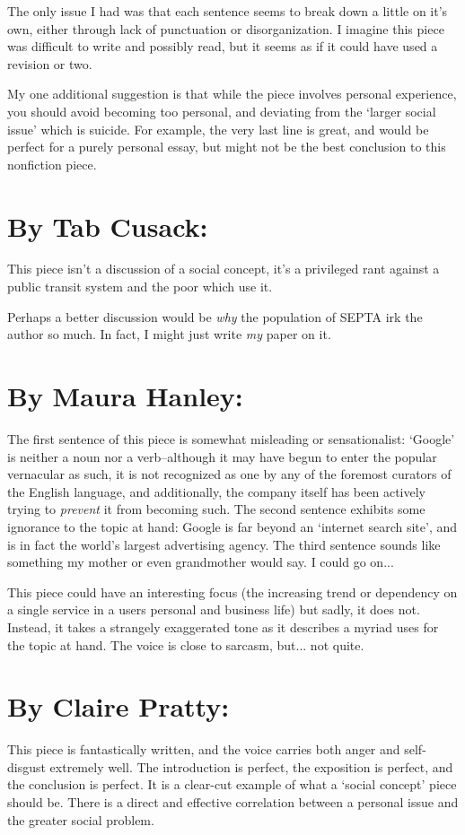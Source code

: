 \documentclass[letterpaper]{article}
\begin{document}
    The only issue I had was that each sentence seems to break down a little on it's own, either through lack of punctuation or disorganization. I imagine this piece was difficult to write and possibly read, but it seems as if it could have used a revision or two.

    My one additional suggestion is that while the piece involves personal experience, you should avoid becoming too personal, and deviating from the `larger social issue' which is suicide. For example, the very last line is great, and would be perfect for a purely personal essay, but might not be the best conclusion to this nonfiction piece.

    \section{By Tab Cusack:}
    This piece isn't a discussion of a social concept, it's a privileged rant against a public transit system and the poor which use it.

    Perhaps a better discussion would be \emph{why} the population of SEPTA irk the author so much. In fact, I might just write \emph{my} paper on it.
    \section{By Maura Hanley:}
    
    The first sentence of this piece is somewhat misleading or sensationalist: `Google' is neither a noun nor a verb--although it may have begun to enter the popular vernacular as such, it is not recognized as  one by any of the foremost curators of the English language, and additionally, the company itself has been actively trying to \emph{prevent} it from becoming such. The second sentence exhibits some ignorance to the topic at hand: Google is far beyond an `internet search site', and is in fact the world's largest advertising agency. The third sentence sounds like something my mother or even grandmother would say. I could go on...

    This piece could have an interesting focus (the increasing trend or dependency on a single service in a users personal and business life) but sadly, it does not. Instead, it takes a strangely exaggerated tone as it describes a myriad uses for the topic at hand. The voice is close to sarcasm, but... not quite.

    \section{By Claire Pratty:}
    This piece is fantastically written, and the voice carries both anger and self-disgust extremely well. The introduction is perfect, the exposition is perfect, and the conclusion is perfect. It is a clear-cut example of what a `social concept' piece should be. There is a direct and effective correlation between a personal issue and the greater social problem.
\end{document}
